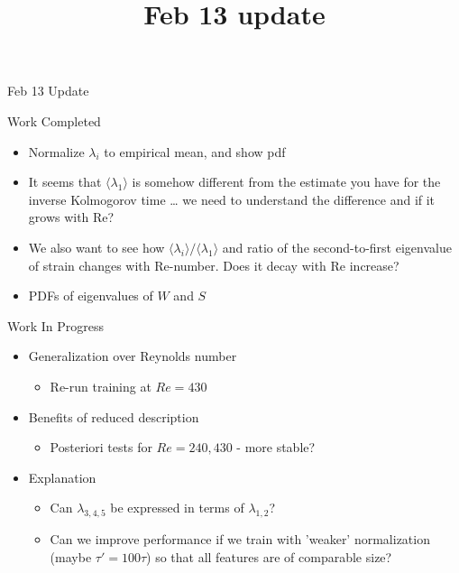 \documentclass[pdf,9pt]{beamer}
\title{Feb 13 update}
\newcommand{\<}{\langle}
\renewcommand{\>}{\rangle}
\begin{document}
\begin{frame}{Feb 13 Update}
  \begin{exampleblock}{Work Completed}
    \begin{itemize}
    \item Normalize $\lambda_i$ to empirical mean, and show pdf
    \item It seems that $\langle\lambda_1\rangle$ is somehow different from the estimate you have for the inverse Kolmogorov time … we need to understand the difference and if it grows with Re?
    \item We also want to see how $\langle \lambda_i\rangle / \langle \lambda_1 \rangle$ and  ratio of the second-to-first eigenvalue of strain changes with Re-number. Does it decay with Re increase?
    \item PDFs of eigenvalues of $W$ and $S$
    \end{itemize}
  \end{exampleblock}

  \begin{block}{Work In Progress}
    \begin{itemize}
    \item Generalization over Reynolds number
      \begin{itemize}
      \item Re-run training at $Re = 430$
      \end{itemize}
    \item Benefits of reduced description      
      \begin{itemize}
      \item Posteriori tests for $Re = 240,430$ - more stable?
      \end{itemize}
    \item Explanation
      \begin{itemize}
      \item Can $\lambda_{3,4,5}$ be expressed in terms of $\lambda_{1,2}$?
      \item Can we improve performance if we train with 'weaker' normalization (maybe $\tau' = 100\tau$) so that all features are of comparable size?
      \end{itemize}
    \end{itemize}
  \end{block}
  
\end{frame}
\end{document}
